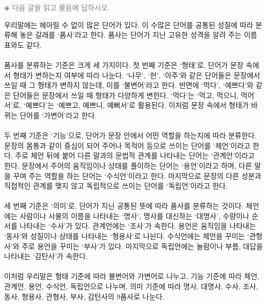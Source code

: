 \documentclass[10pt,a4paper]{article}
\begin{document}
\vspace{4mm}
{\small\textcolor{gray}{◈ 다음 글을 읽고 물음에 답하시오.}}
\vspace{2mm}
\begin{tcolorbox}[passage]
우리말에는 헤아릴 수 없이 많은 단어가 있다. 이 수많은 단어를 공통된 성질에 따라 분류해 놓은 갈래를 ‘품사’라고 한다. 품사는 단어가 지닌 고유한 성격을 알려 주는 이름표와도 같다. \\{}
\vspace{4pt} \\{}
품사를 분류하는 기준은 크게 세 가지이다. 첫 번째 기준은 ‘형태’로, 단어가 문장 속에서 형태가 변하는지 여부에 따라 나눈다. ‘나무’, ‘헌’, ‘아주’와 같은 단어들은 문장에서 쓰일 때 그 형태가 변하지 않는데, 이를 ‘불변어’라고 한다. 반면에 ‘먹다’, ‘예쁘다’와 같은 단어들은 문장에서 쓰일 때 형태가 다양하게 변한다. ‘먹다’는 ‘먹고, 먹으니, 먹어서’로, ‘예쁘다’는 ‘예쁘고, 예쁘니, 예뻐서’로 활용된다. 이처럼 문장 속에서 형태가 바뀌는 단어를 ‘가변어’라고 한다. \\{}
\vspace{4pt} \\{}
두 번째 기준은 ‘기능’으로, 단어가 문장 안에서 어떤 역할을 하는지에 따라 분류한다. 문장의 몸통과 같이 중심이 되어 주어나 목적어 등으로 쓰이는 단어를 ‘체언’이라고 한다. 주로 체언 뒤에 붙어 다른 말과의 문법적 관계를 나타내는 단어는 ‘관계언’이라고 한다. 문장에서 주어의 움직임이나 상태를 풀이하는 단어는 ‘용언’이라고 하며, 다른 말을 꾸며 주는 역할을 하는 단어는 ‘수식언’이라고 한다. 마지막으로 문장의 다른 성분과 직접적인 관계를 맺지 않고 독립적으로 쓰이는 단어를 ‘독립언’이라고 한다. \\{}
\vspace{4pt} \\{}
세 번째 기준은 ‘의미’로, 단어가 지닌 공통된 뜻에 따라 품사를 분류하는 것이다. 체언에는 사람이나 사물의 이름을 나타내는 ‘명사’, 명사를 대신하는 ‘대명사’, 수량이나 순서를 나타내는 ‘수사’가 있다. 관계언에는 ‘조사’가 속한다. 용언은 움직임을 나타내는 ‘동사’와 성질이나 상태를 나타내는 ‘형용사’로 나뉜다. 수식언에는 체언을 꾸미는 ‘관형사’와 주로 용언을 꾸미는 ‘부사’가 있다. 마지막으로 독립언에는 놀람이나 부름, 대답을 나타내는 ‘감탄사’가 속한다. \\{}
\vspace{4pt} \\{}
이처럼 우리말은 형태 기준에 따라 불변어와 가변어로 나누고, 기능 기준에 따라 체언, 관계언, 용언, 수식언, 독립언으로 나누며, 의미 기준에 따라 명사, 대명사, 수사, 조사, 동사, 형용사, 관형사, 부사, 감탄사의 9품사로 나눈다.
\end{tcolorbox}
\end{document}
